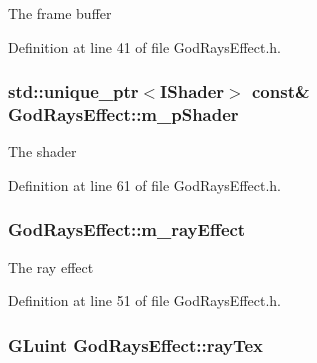 The frame buffer 



Definition at line 41 of file God\+Rays\+Effect.\+h.

\subsubsection[{\texorpdfstring{m\+\_\+p\+Shader}{m_pShader}}]{\setlength{\rightskip}{0pt plus 5cm}std\+::unique\+\_\+ptr$<${\bf I\+Shader}$>$ const\& God\+Rays\+Effect\+::m\+\_\+p\+Shader\hspace{0.3cm}{\ttfamily [private]}}\hypertarget{class_god_rays_effect_a37e1e9a2264b18594ff6e6a3bbda3d5b}{}\label{class_god_rays_effect_a37e1e9a2264b18594ff6e6a3bbda3d5b}


The shader 



Definition at line 61 of file God\+Rays\+Effect.\+h.

\subsubsection[{\texorpdfstring{m\+\_\+ray\+Effect}{m_rayEffect}}]{ God\+Rays\+Effect\+::m\+\_\+ray\+Effect\hspace{0.3cm}{\ttfamily [private]}}\hypertarget{class_god_rays_effect_a1fd31b7f67687b9249fcd7a17b9dd2a5}{}\label{class_god_rays_effect_a1fd31b7f67687b9249fcd7a17b9dd2a5}


The ray effect 



Definition at line 51 of file God\+Rays\+Effect.\+h.

\subsubsection[{\texorpdfstring{ray\+Tex}{rayTex}}]{\setlength{\rightskip}{0pt plus 5cm}G\+Luint God\+Rays\+Effect\+::ray\+Tex\hspace{0.3cm}{\ttfamily [private]}}\hypertarget{class_god_rays_effect_a3b83f80557cf2e0b35f423970a379ffb}{}\label{class_god_rays_effect_a3b83f80557cf2e0b35f423970a379ffb}


